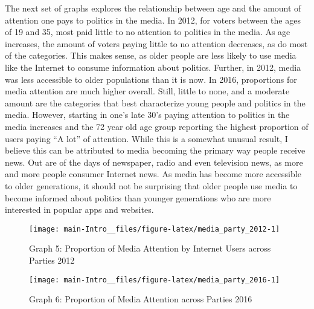 \documentclass[11pt,]{article}
\begin{document}
The next set of graphs explores the relationship between age and the
amount of attention one pays to politics in the media. In 2012, for
voters between the ages of 19 and 35, most paid little to no attention
to politics in the media. As age increases, the amount of voters paying
little to no attention decreases, as do most of the categories. This
makes sense, as older people are less likely to use media like the
Internet to consume information about politics. Further, in 2012, media
was less accessible to older populations than it is now. In 2016,
proportions for media attention are much higher overall. Still, little
to none, and a moderate amount are the categories that best characterize
young people and politics in the media. However, starting in one's late
30's paying attention to politics in the media increases and the 72 year
old age group reporting the highest proportion of users paying ``A lot''
of attention. While this is a somewhat unusual result, I believe this
can be attributed to media becoming the primary way people receive news.
Out are of the days of newspaper, radio and even television news, as
more and more people consumer Internet news. As media has become more
accessible to older generations, it should not be surprising that older
people use media to become informed about politics than younger
generations who are more interested in popular apps and websites.

\begin{figure}

{\centering \texttt{[image: main-Intro\_\_files/figure-latex/media\_party\_2012-1]} 

}

\caption{Graph 5: Proportion of Media Attention by Internet Users across Parties 2012}\label{fig:media_party_2012}
\end{figure}

\begin{figure}

{\centering \texttt{[image: main-Intro\_\_files/figure-latex/media\_party\_2016-1]} 

}

\caption{Graph 6: Proportion of Media Attention across Parties 2016}\label{fig:media_party_2016}
\end{figure}
\end{document}
